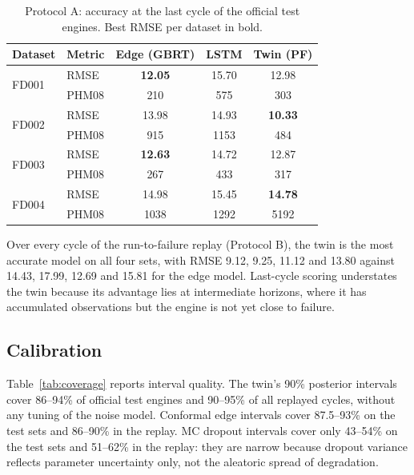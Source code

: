 \documentclass[preprint,12pt,authoryear]{elsarticle}
\newcommand{\botrule}{\bottomrule}
\begin{document}
\begin{table}[t]
\caption{Protocol A: accuracy at the last cycle of the official test engines. Best RMSE per dataset in bold.}\label{tab:accuracy}
\begin{tabular*}{\textwidth}{@{\extracolsep\fill}llccc}
\toprule
Dataset & Metric & Edge (GBRT) & LSTM & Twin (PF) \\
\midrule
\multirow{2}{*}{FD001} & RMSE  & \textbf{12.05} & 15.70 & 12.98 \\
                       & PHM08 & 210 & 575 & 303 \\
\multirow{2}{*}{FD002} & RMSE  & 13.98 & 14.93 & \textbf{10.33} \\
                       & PHM08 & 915 & 1153 & 484 \\
\multirow{2}{*}{FD003} & RMSE  & \textbf{12.63} & 14.72 & 12.87 \\
                       & PHM08 & 267 & 433 & 317 \\
\multirow{2}{*}{FD004} & RMSE  & 14.98 & 15.45 & \textbf{14.78} \\
                       & PHM08 & 1038 & 1292 & 5192 \\
\botrule
\end{tabular*}
\end{table}

Over every cycle of the run-to-failure replay (Protocol B), the twin is the most accurate model on all four sets, with RMSE 9.12, 9.25, 11.12 and 13.80 against 14.43, 17.99, 12.69 and 15.81 for the edge model. Last-cycle scoring understates the twin because its advantage lies at intermediate horizons, where it has accumulated observations but the engine is not yet close to failure.

\subsection{Calibration}
Table~\ref{tab:coverage} reports interval quality. The twin's 90\% posterior intervals cover 86--94\% of official test engines and 90--95\% of all replayed cycles, without any tuning of the noise model. Conformal edge intervals cover 87.5--93\% on the test sets and 86--90\% in the replay. MC dropout intervals cover only 43--54\% on the test sets and 51--62\% in the replay: they are narrow because dropout variance reflects parameter uncertainty only, not the aleatoric spread of degradation.
\end{document}
